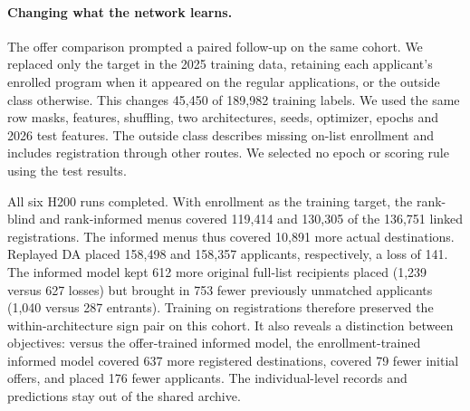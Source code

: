 \paragraph{Changing what the network learns.}
The offer comparison prompted a paired follow-up on the same cohort. We replaced only the target in the 2025 training data, retaining each applicant's enrolled program when it appeared on the regular applications, or the outside class otherwise. This changes 45,450 of 189,982 training labels. We used the same row masks, features, shuffling, two architectures, seeds, optimizer, epochs and 2026 test features. The outside class describes missing on-list enrollment and includes registration through other routes. We selected no epoch or scoring rule using the test results.

All six H200 runs completed. With enrollment as the training target, the rank-blind and rank-informed menus covered 119,414 and 130,305 of the 136,751 linked registrations. The informed menus thus covered 10,891 more actual destinations. Replayed DA placed 158,498 and 158,357 applicants, respectively, a loss of 141. The informed model kept 612 more original full-list recipients placed (1,239 versus 627 losses) but brought in 753 fewer previously unmatched applicants (1,040 versus 287 entrants). Training on registrations therefore preserved the within-architecture sign pair on this cohort. It also reveals a distinction between objectives: versus the offer-trained informed model, the enrollment-trained informed model covered 637 more registered destinations, covered 79 fewer initial offers, and placed 176 fewer applicants. The individual-level records and predictions stay out of the shared archive.
